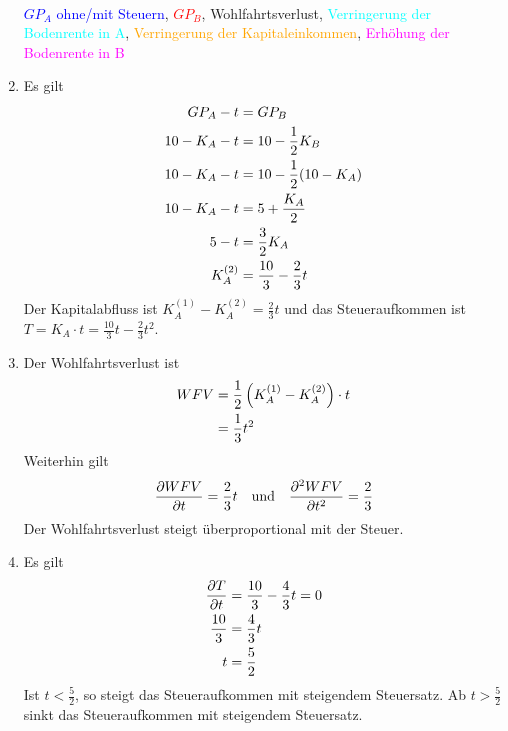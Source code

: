 \documentclass{article}
\begin{document}
\begin{enumerate}[label=(\alph*)]
\begin{center}
\begin{tikzpicture}
			\end{tikzpicture} \\
			\textcolor{blue}{$GP_A$ ohne/mit Steuern}, \textcolor{red}{$GP_B$}, \textcolor{green!80!black}{Wohlfahrtsverlust}, \textcolor{cyan}{Verringerung der Bodenrente in A}, \textcolor{orange}{Verringerung der Kapitaleinkommen}, \textcolor{magenta}{Erhöhung der Bodenrente in B}
		\end{center}
		\item Es gilt
		\begin{align}
			GP_A - t &= GP_B \notag \\
			10-K_A-t &= 10-\frac{1}{2}K_B \notag \\
			10-K_A-t &= 10-\frac{1}{2}(10-K_A) \notag \\
			10-K_A-t &= 5+\frac{K_A}{2} \notag \\
			5-t &= \frac{3}{2}K_A \notag \\
			K_A^{(2)} &= \frac{10}{3}-\frac{2}{3}t \notag
		\end{align}
		Der Kapitalabfluss ist $K_A^{(1)}-K_A^{(2)}=\frac{2}{3}t$ und das Steueraufkommen ist $T=K_A\cdot t=\frac{10}{3}t - \frac{2}{3}t^2$.
		\item Der Wohlfahrtsverlust ist
		\begin{align}
			WFV &= \frac{1}{2}\left(K_A^{(1)} - K_A^{(2)}\right)\cdot t \notag \\
			&= \frac{1}{3}t^2 \notag
		\end{align}
		Weiterhin gilt
		\begin{align}
			\frac{\partial WFV}{\partial t} = \frac{2}{3}t \quad\text{und}\quad \frac{\partial^2 WFV}{\partial t^2} = \frac{2}{3} \notag
		\end{align}
		Der Wohlfahrtsverlust steigt überproportional mit der Steuer.
		\item Es gilt
		\begin{align}
			\frac{\partial T}{\partial t} &= \frac{10}{3} - \frac{4}{3}t = 0 \notag \\
			\frac{10}{3} &= \frac{4}{3}t \notag \\
			t &= \frac{5}{2} \notag
		\end{align}
		Ist $t<\frac{5}{2}$, so steigt das Steueraufkommen mit steigendem Steuersatz. Ab $t>\frac{5}{2}$ sinkt das Steueraufkommen mit steigendem Steuersatz.
	\end{enumerate}
	
\end{document}
